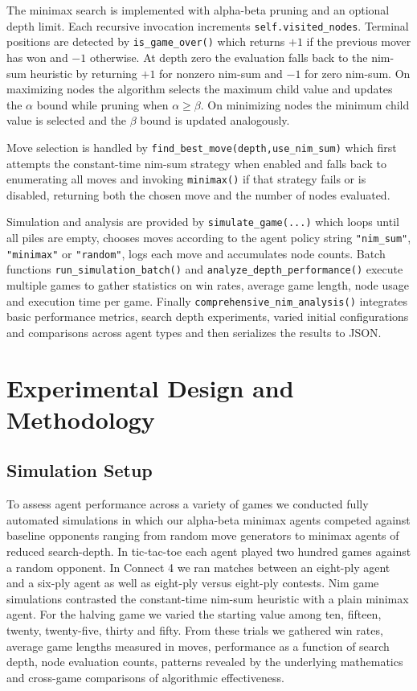 \documentclass[12pt]{article}
\begin{document}
The minimax search is implemented with alpha-beta pruning and an optional depth limit. Each recursive invocation increments \texttt{self.visited\_nodes}. Terminal positions are detected by \texttt{is\_game\_over()} which returns \(+1\) if the previous mover has won and \(-1\) otherwise. At depth zero the evaluation falls back to the nim-sum heuristic by returning \(+1\) for nonzero nim-sum and \(-1\) for zero nim-sum. On maximizing nodes the algorithm selects the maximum child value and updates the \(\alpha\) bound while pruning when \(\alpha \ge \beta\). On minimizing nodes the minimum child value is selected and the \(\beta\) bound is updated analogously.

Move selection is handled by \texttt{find\_best\_move(depth,use\_nim\_sum)} which first attempts the constant-time nim-sum strategy when enabled and falls back to enumerating all moves and invoking \texttt{minimax()} if that strategy fails or is disabled, returning both the chosen move and the number of nodes evaluated.

Simulation and analysis are provided by \texttt{simulate\_game(...)} which loops until all piles are empty, chooses moves according to the agent policy string \texttt{"nim\_sum"}, \texttt{"minimax"} or \texttt{"random"}, logs each move and accumulates node counts. Batch functions \texttt{run\_simulation\_batch()} and \texttt{analyze\_depth\_performance()} execute multiple games to gather statistics on win rates, average game length, node usage and execution time per game. Finally \texttt{comprehensive\_nim\_analysis()} integrates basic performance metrics, search depth experiments, varied initial configurations and comparisons across agent types and then serializes the results to JSON.

\section{Experimental Design and Methodology}

\subsection{Simulation Setup}

To assess agent performance across a variety of games we conducted fully automated simulations in which our alpha-beta minimax agents competed against baseline opponents ranging from random move generators to minimax agents of reduced \gls{search-depth}. In tic-tac-toe each agent played two hundred games against a random opponent. In Connect 4 we ran matches between an eight-ply agent and a six-ply agent as well as eight-ply versus eight-ply contests. Nim game simulations contrasted the constant-time \gls{nim-sum} \gls{heuristic} with a plain minimax agent. For the halving game we varied the starting value among ten, fifteen, twenty, twenty-five, thirty and fifty. From these trials we gathered win rates, average game lengths measured in moves, performance as a function of search depth, node evaluation counts, patterns revealed by the underlying mathematics and cross-game comparisons of algorithmic effectiveness.
\end{document}
